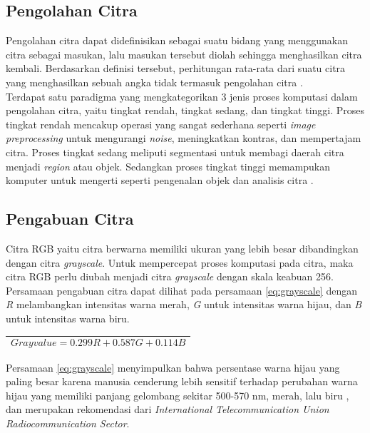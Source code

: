 \subsection{Pengolahan Citra}
\noindent Pengolahan citra dapat didefinisikan sebagai suatu bidang yang menggunakan citra sebagai masukan, lalu masukan tersebut diolah sehingga menghasilkan citra kembali. Berdasarkan definisi tersebut, perhitungan rata-rata dari suatu citra yang menghasilkan sebuah angka tidak termasuk pengolahan citra \cite{gonzalez}.\\
\noindent Terdapat satu paradigma yang mengkategorikan 3 jenis proses komputasi dalam pengolahan citra, yaitu tingkat rendah, tingkat sedang, dan tingkat tinggi. Proses tingkat rendah mencakup operasi yang sangat sederhana seperti \textit{image preprocessing} untuk mengurangi \textit{noise}, meningkatkan kontras, dan mempertajam citra. Proses tingkat sedang meliputi segmentasi untuk membagi daerah citra menjadi \textit{region} atau objek. Sedangkan proses tingkat tinggi memampukan komputer untuk mengerti seperti pengenalan objek dan analisis citra \cite{gonzalez}. \\

\subsection{Pengabuan Citra}
\noindent Citra RGB yaitu citra berwarna memiliki ukuran yang lebih besar dibandingkan dengan citra \textit{grayscale}. Untuk mempercepat proses komputasi pada citra, maka citra RGB perlu diubah menjadi citra \textit{grayscale} dengan skala keabuan 256. Persamaan pengabuan citra dapat dilihat pada persamaan \ref{eq:grayscale} dengan \textit{R} melambangkan intensitas warna merah, \textit{G} untuk intensitas warna hijau, dan \textit{B} untuk intensitas warna biru. 

\begin{table}[H]
	\begin{adjustbox}{width=1\textwidth}
		\begin{tabular}{|p{13.55cm}|}
			\hline
			\begin{equation}
			Gray value = 0.299 R + 0.587 G + 0.114 B
			\label{eq:grayscale}
			\end{equation}\\
			\hline
		\end{tabular}
	\end{adjustbox}
\end{table}

\noindent Persamaan \ref{eq:grayscale} menyimpulkan bahwa persentase warna hijau yang paling besar karena manusia cenderung lebih sensitif terhadap perubahan warna hijau yang memiliki panjang gelombang sekitar 500-570 nm, merah, lalu biru \cite{ragb}, dan merupakan rekomendasi dari \textit{International Telecommunication Union Radiocommunication Sector}.\\

